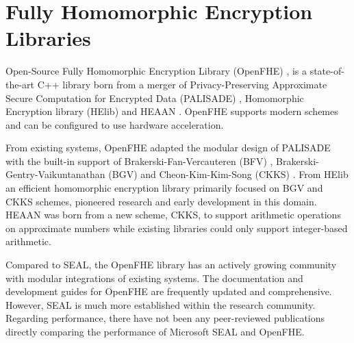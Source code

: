 \section{Fully Homomorphic Encryption Libraries}

Open-Source Fully Homomorphic Encryption Library (OpenFHE) \cite{Al_Badawi2022-openFHE}, is a state-of-the-art C++ library born from a merger of Privacy-Preserving Approximate Secure Computation for Encrypted Data (PALISADE) \cite{PALISADE}, Homomorphic Encryption library (HElib) \cite{HElib} and HEAAN \cite{Cheon2017-CKKS}. OpenFHE supports modern schemes and can be configured to use hardware acceleration.

From existing systems, OpenFHE adapted the modular design of PALISADE with the built-in support of Brakerski-Fan-Vercauteren (BFV) \cite{fan2012-bfv}, Brakerski-Gentry-Vaikuntanathan (BGV) \cite{brakerski2012-bgv} and Cheon-Kim-Kim-Song (CKKS) \cite{Cheon2017-CKKS}. From HElib an efficient homomorphic encryption library primarily focused on BGV and CKKS schemes, pioneered research and early development in this domain. HEAAN was born from a new scheme, CKKS, to support arithmetic operations on approximate numbers while existing libraries could only support integer-based arithmetic.

Compared to SEAL, the OpenFHE library has an actively growing community with modular integrations of existing systems. The documentation and development guides for OpenFHE are frequently updated and comprehensive. However, SEAL is much more established within the research community. Regarding performance, there have not been any peer-reviewed publications directly comparing the performance of Microsoft SEAL and OpenFHE.
